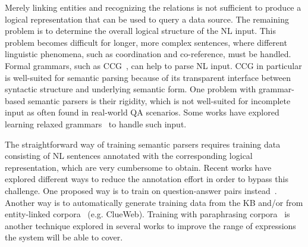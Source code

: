 
Merely linking entities and recognizing the relations is not sufficient to produce a logical representation that can be used to query a data source.
The remaining problem is to determine the overall logical structure of the NL input.
This problem becomes difficult for longer, more complex sentences, where different linguistic phenomena, such as coordination and co-reference, must be handled.
Formal grammars, such as CCG~\cite{ccg}, can help to parse NL input.
CCG in particular is well-suited for semantic parsing because of its transparent interface between syntactic structure and underlying semantic form.
One problem with grammar-based semantic parsers is their rigidity, which is not well-suited for incomplete input as often found in real-world QA scenarios.
Some works have explored learning relaxed grammars~\cite{relaxedccg} to handle such input.

The straightforward way of training semantic parsers requires training data consisting of NL sentences annotated with the corresponding logical representation, which are very cumbersome to obtain.
Recent works have explored different ways to reduce the annotation effort in order to bypass this challenge.
One proposed way is to train on question-answer pairs instead~\cite{parasempre}. %
Another way is to automatically generate training data from the KB %
and/or from entity-linked corpora~\cite{reddy} %
 (e.g. ClueWeb). %
Training with paraphrasing corpora~\cite{parasempre} %
is another technique explored in several works to improve the range of expressions the system will be able to cover.

